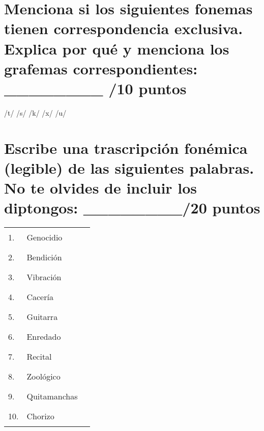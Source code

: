 \documentclass[12pt]{exam}
\begin{document}
\section{Menciona si los siguientes fonemas tienen correspondencia exclusiva. Explica por qué y menciona los grafemas correspondientes: \_\_\_\_\_\_\_\_ /10 puntos}

	\begin{questions}
		\question /t/ 
		\fillwithlines{.75in}
		\question /s/
		\fillwithlines{.75in}
		\question /k/
		\fillwithlines{.75in}
		\question /x/
		\fillwithlines{.75in}
		\question /u/
		\fillwithlines{.75in}
	\end{questions}
	
\section{Escribe una trascripción fonémica (legible) de las siguientes palabras. No te olvides de incluir los diptongos: \_\_\_\_\_\_\_\_/20 puntos}


\renewcommand{\arraystretch}{1.75}
	\begin{tabular}{llc}
		1.  & Genocidio		& \hspace{5mm}\rule{55mm}{.3mm} \\
		2.  & Bendición		& \hspace{5mm}\rule{55mm}{.3mm} \\
		3.  & Vibración		& \hspace{5mm}\rule{55mm}{.3mm} \\
		4.  & Cacería		& \hspace{5mm}\rule{55mm}{.3mm} \\
		5.  & Guitarra		& \hspace{5mm}\rule{55mm}{.3mm} \\
		6.  & Enredado		& \hspace{5mm}\rule{55mm}{.3mm} \\
		7.  & Recital		& \hspace{5mm}\rule{55mm}{.3mm} \\
		8.  & Zoológico		& \hspace{5mm}\rule{55mm}{.3mm} \\
		9.  & Quitamanchas	& \hspace{5mm}\rule{55mm}{.3mm} \\
		10. & Chorizo		& \hspace{5mm}\rule{55mm}{.3mm} \\
	\end{tabular}
	
\end{document}
